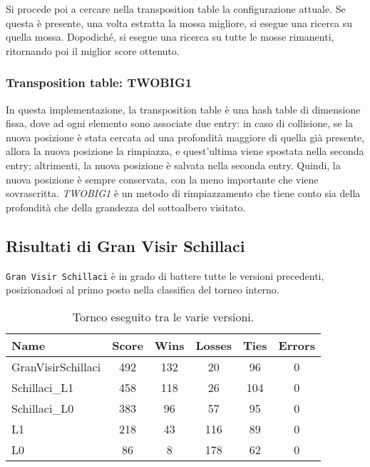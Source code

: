 Si procede poi a cercare nella transposition table la configurazione attuale. Se questa è presente, una volta estratta la mossa migliore, si esegue una ricerca su quella mossa.
Dopodiché, si esegue una ricerca su tutte le mosse rimanenti, ritornando poi il miglior score ottenuto.

\subsubsection{Transposition table: TWOBIG1}

In questa implementazione, la transposition table è una hash table di dimensione fissa, dove ad ogni elemento sono associate due entry: in caso di collisione, se la nuova posizione è stata cercata ad una profondità maggiore di quella già presente, allora la nuova posizione la rimpiazza, e quest'ultima viene spostata nella seconda entry; altrimenti, la nuova posizione è salvata nella seconda entry.
Quindi, la nuova posizione è sempre conservata, con la meno importante che viene sovrascritta.
\textit{TWOBIG1} \cite{BDU70} è un metodo di rimpiazzamento che tiene conto sia della profondità che della grandezza del sottoalbero visitato.

\subsection{Risultati di Gran Visir Schillaci}

\verb!Gran Visir Schillaci! è in grado di battere tutte le versioni precedenti, posizionadosi al primo posto nella classifica del torneo interno.

\begin{center}
    \begin{table}[h!]
        \centering
        \begin{tabular}{||l|cccc|c||}
            \hline
            Name               & Score & Wins & Losses & Ties & Errors \\
            \hline
            \rowcolor{lightgray}
            GranVisirSchillaci & 492   & 132  & 20     & 96   & 0      \\
            Schillaci\_L1      & 458   & 118  & 26     & 104  & 0      \\
            Schillaci\_L0      & 383   & 96   & 57     & 95   & 0      \\
            L1                 & 218   & 43   & 116    & 89   & 0      \\
            L0                 & 86    & 8    & 178    & 62   & 0      \\
            \hline
        \end{tabular}
        \caption{Torneo eseguito tra le varie versioni.}
        \label{table:2}
    \end{table}

\end{center}

